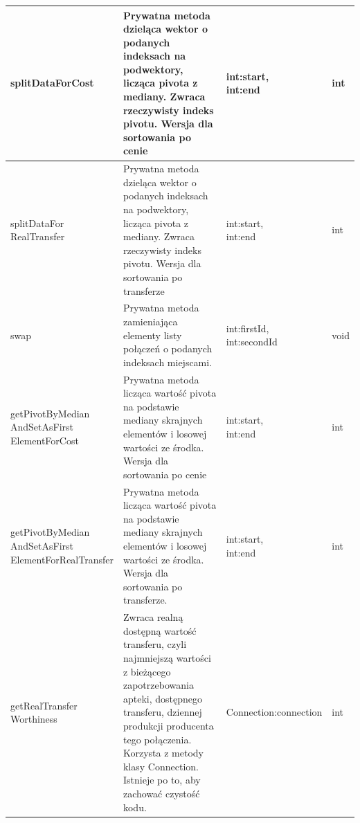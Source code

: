 \documentclass[a4paper]{article}
\begin{document}
{\begin{tabular}{| p{3.5cm} | p{5cm} | p{3cm} | m{2cm} |}
\parbox[t]{3cm}{splitDataForCost} & 
\parbox[t]{5cm}{Prywatna metoda dzieląca wektor o podanych indeksach na podwektory, licząca pivota z mediany. Zwraca rzeczywisty indeks pivotu. Wersja dla sortowania po cenie} & 
\parbox[t]{3cm}{int:start,\\int:end} &
\parbox[t]{2cm}{int} \\ \hline

\parbox[t]{3cm}{splitDataFor\\RealTransfer} & 
\parbox[t]{5cm}{Prywatna metoda dzieląca wektor o podanych indeksach na podwektory, licząca pivota z mediany. Zwraca rzeczywisty indeks pivotu. Wersja dla sortowania po transferze} & 
\parbox[t]{3cm}{int:start,\\int:end} &
\parbox[t]{2cm}{int} \\ \hline

\parbox[t]{3cm}{swap} & 
\parbox[t]{5cm}{Prywatna metoda zamieniająca elementy listy połączeń o podanych indeksach miejscami.} & 
\parbox[t]{3cm}{int:firstId,\\int:secondId} &
\parbox[t]{2cm}{void} \\ \hline

\parbox[t]{3cm}{getPivotByMedian\\AndSetAsFirst\\ElementForCost} & 
\parbox[t]{5cm}{Prywatna metoda licząca wartość pivota na podstawie mediany skrajnych elementów i losowej wartości ze środka. Wersja dla sortowania po cenie} & 
\parbox[t]{3cm}{int:start,\\int:end} &
\parbox[t]{2cm}{int} \\ \hline

\parbox[t]{3cm}{getPivotByMedian\\AndSetAsFirst\\ElementForRealTransfer} & 
\parbox[t]{5cm}{Prywatna metoda licząca wartość pivota na podstawie mediany skrajnych elementów i losowej wartości ze środka. Wersja dla sortowania po transferze.} & 
\parbox[t]{3cm}{int:start,\\int:end} &
\parbox[t]{2cm}{int} \\ \hline

\parbox[t]{3cm}{getRealTransfer\\Worthiness} & 
\parbox[t]{5cm}{Zwraca realną dostępną wartość transferu, czyli najmniejszą wartości z bieżącego zapotrzebowania apteki, dostępnego transferu, dziennej produkcji producenta tego połączenia. Korzysta z metody klasy Connection. Istnieje po to, aby zachować czystość kodu.} & 
\parbox[t]{3cm}{Connection:connection} &
\parbox[t]{2cm}{int} \\ \hline
\end{tabular}
}
\newpage
\end{document}
